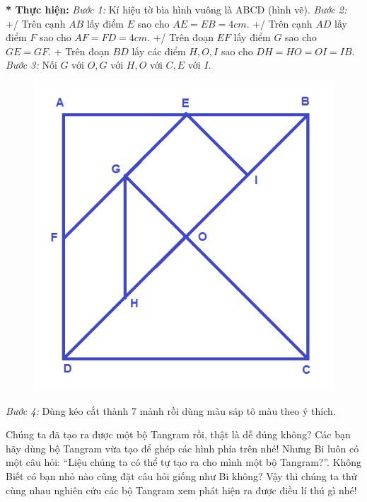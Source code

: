 \begin{multicols}{2}
	\textbf{* Thực hiện:}
	\vskip 0.1cm
	\textit{Bước 1:} Kí hiệu tờ bìa hình vuông là ABCD (hình vẽ).
	\vskip 0.1cm
	\textit{Bước 2:} 
	\vskip0.05cm
	+/ Trên cạnh $AB$ lấy điểm $E$ sao cho $AE = EB = 4cm$.
	\vskip 0.1cm
	+/ Trên cạnh $AD$ lấy điểm $F$ sao cho $AF = FD = 4cm$.
	\vskip 0.1cm
	+/ Trên đoạn $EF$ lấy điểm $G$ sao cho $GE= GF$.
	\vskip 0.1cm
	+ Trên đoạn $BD$ lấy các điểm $H, O, I$ sao cho $DH = HO = OI = IB$.
	\vskip 0.1cm
	\textit{Bước 3:} Nối $G$ với $O, G$ với $H, O$ với $C, E$ với $I$.
	\begin{figure}[H]
		\vspace*{-5pt}
		\centering
		\vspace*{-10pt}
		\includegraphics[scale=0.3]{image9}
		\vspace*{-10pt}
	\end{figure}
	\textit{Bước 4:} Dùng kéo cắt thành 7 mảnh rồi dùng màu sáp tô màu theo ý thích.
	\end{multicols}
	Chúng ta đã tạo ra được một bộ Tangram rồi, thật là dễ đúng không? Các bạn hãy dùng bộ Tangram vừa tạo để ghép các hình phía trên nhé!
	\vskip 0.1cm
	Nhưng Bi luôn có một câu hỏi: “Liệu chúng ta có thể tự tạo ra cho mình một bộ Tangram?”. Không Biết có bạn nhỏ nào cũng đặt câu hỏi giống như Bi không?
	\vskip 0.1cm
	Vậy thì chúng ta thử cùng nhau nghiên cứu các bộ Tangram xem phát hiện ra được điều lí thú gì nhé!
